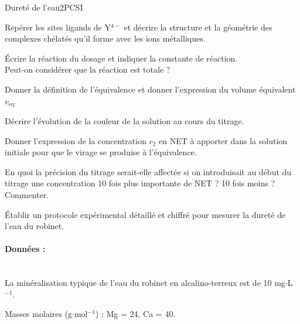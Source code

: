 \begin{exercise}{Dureté de l'eau}{2}{PCSI}
\begin{questions}
\question Repérer les sites ligands de Y$^{4-}$ et décrire la structure et la géométrie des complexes chélatés qu'il forme avec les ions métalliques.


\question \'Ecrire la réaction du dosage et indiquer la constante de réaction. \\
Peut-on considérer que la réaction est totale ?

\question Donner la définition de l'équivalence et donner l'expression du volume équivalent $v_\text{eq}$.


\question Décrire l'évolution de la couleur de la solution au cours du titrage.

\question Donner l'expression de la concentration $c_2$ en NET à apporter dans la solution initiale pour que le virage se produise à l’équivalence.

\question En quoi la précision du titrage serait-elle affectée si on introduisait au début du titrage une concentration 10 fois plus importante de NET ? 10 fois moins ? Commenter.

 \'Etablir un protocole expérimental détaillé et chiffré pour mesurer la dureté de l'eau du robinet.

\end{questions}

\paragraph{Données : }~\\
La minéralisation typique de l'eau du robinet en alcalino-terreux est de 10 mg$\cdot$L$^{-1}$.

\noindent Masses molaires (g$\cdot$mol$^{-1}$) : Mg = 24, Ca = 40. 

\end{exercise}

